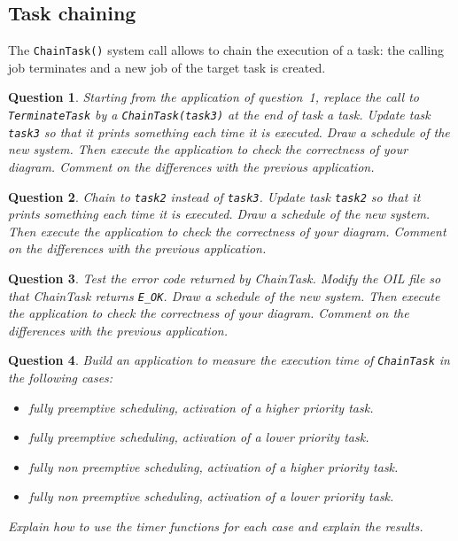 \documentclass[11pt]{report}
\newtheorem{ex}{Question}
\begin{document}
\subsection{Task chaining}

The \texttt{ChainTask()} system call allows to chain the execution of a task: the calling job terminates and a new job of the target task is created.

\begin{ex}
    Starting from the application of question~1, replace the call to \texttt{TerminateTask} by a \texttt{ChainTask(task3)} at the end of task a task.
    Update task \texttt{task3} so that it prints something each time it is executed.
    Draw a schedule of the new system.
    Then execute the application to check the correctness of your diagram.
    Comment on the differences with the previous application.
\end{ex}

\begin{ex}
    Chain to \texttt{task2} instead of \texttt{task3}.
    Update task \texttt{task2} so that it prints something each time it is executed.
    Draw a schedule of the new system.
    Then execute the application to check the correctness of your diagram.
    Comment on the differences with the previous application.
\end{ex}

\begin{ex}
    Test the error code returned by ChainTask.
    Modify the OIL file so that ChainTask returns \texttt{E\_OK}.
    Draw a schedule of the new system.
    Then execute the application to check the correctness of your diagram.
    Comment on the differences with the previous application.
\end{ex}

\begin{ex}
    Build an application to measure the execution time of \texttt{ChainTask} in the following cases:
    \begin{itemize}
        \item fully preemptive scheduling, activation of a higher priority task.
        \item fully preemptive scheduling, activation of a lower priority task.
        \item fully non preemptive scheduling, activation of a higher priority task.
        \item fully non preemptive scheduling, activation of a lower priority task.
    \end{itemize}

    Explain how to use the timer functions for each case and explain the results.
\end{ex}
\end{document}

